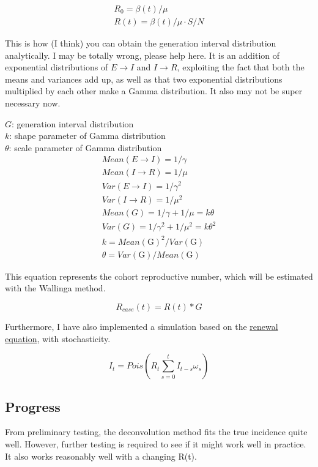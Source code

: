 \documentclass{article}
\begin{document}
\begin{align}
    R_0 = \beta(t)/\mu \\
    R(t) = \beta(t)/\mu \cdot S/N
\end{align}

This is how (I think) you can obtain the generation interval distribution analytically. I may be totally wrong, please help here. It is an addition of exponential distributions of $E \xrightarrow{}I$ and $I \xrightarrow{} R$, exploiting the fact that both the means and variances add up, as well as that two exponential distributions multiplied by each other make a Gamma distribution. It also may not be super necessary now.


$G$: generation interval distribution \\ 
$k$: shape parameter of Gamma distribution\\
$\theta$: scale parameter of Gamma distribution\\

\begin{align}
    Mean(E \xrightarrow{}I) = 1/\gamma \\ 
    Mean(I \xrightarrow{}R) = 1/\mu \\ 
    Var(E \xrightarrow{}I) = 1/\gamma^2 \\ 
    Var(I \xrightarrow{}R) = 1/\mu^2 \\
    Mean(G) = 1/\gamma + 1/\mu = k\theta\\ 
    Var(G) = 1/\gamma^2 + 1/\mu^2 = k\theta^2 \\ 
    k =  Mean(\text{G})^2/Var(\text{G}) \\
    \theta = Var(\text{G})/Mean(\text{G})
\end{align}

This equation represents the cohort reproductive number, which will be estimated with the Wallinga method.

\begin{equation}
    R_{case}(t) = R(t) * G
\end{equation}

Furthermore, I have also implemented a simulation based on the  \href{https://www.ncbi.nlm.nih.gov/pmc/articles/PMC5871640/}{renewal equation}, with stochasticity.

\begin{equation}
    I_t = Pois(R_t \sum_{s=0}^t I_{t-s} \omega_s)
\end{equation}

\subsection{Progress}
From preliminary testing, the deconvolution method fits the true incidence quite well. However, further testing is required to see if it might work well in practice. It also works reasonably well with a changing R(t). 
\end{document}
